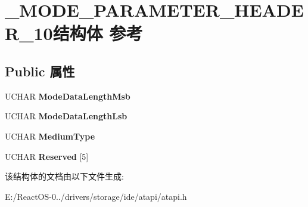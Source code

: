 \hypertarget{struct___m_o_d_e___p_a_r_a_m_e_t_e_r___h_e_a_d_e_r__10}{}\section{\+\_\+\+M\+O\+D\+E\+\_\+\+P\+A\+R\+A\+M\+E\+T\+E\+R\+\_\+\+H\+E\+A\+D\+E\+R\+\_\+10结构体 参考}
\label{struct___m_o_d_e___p_a_r_a_m_e_t_e_r___h_e_a_d_e_r__10}
\subsection*{Public 属性}
\begin{DoxyCompactItemize}
\item 
\mbox{\label{struct___m_o_d_e___p_a_r_a_m_e_t_e_r___h_e_a_d_e_r__10_acf838c5de0e54ced33bde86a585ef5c8}} 
U\+C\+H\+AR {\bfseries Mode\+Data\+Length\+Msb}
\item 
\mbox{\label{struct___m_o_d_e___p_a_r_a_m_e_t_e_r___h_e_a_d_e_r__10_a2e7b2186ecc2ce3bc2bddcda6f06cdad}} 
U\+C\+H\+AR {\bfseries Mode\+Data\+Length\+Lsb}
\item 
\mbox{\label{struct___m_o_d_e___p_a_r_a_m_e_t_e_r___h_e_a_d_e_r__10_a69d4b6c7022656b48b2c63b30abd3531}} 
U\+C\+H\+AR {\bfseries Medium\+Type}
\item 
\mbox{\label{struct___m_o_d_e___p_a_r_a_m_e_t_e_r___h_e_a_d_e_r__10_af88077067fab09d120fe6195d0e343de}} 
U\+C\+H\+AR {\bfseries Reserved} \mbox{[}5\mbox{]}
\end{DoxyCompactItemize}


该结构体的文档由以下文件生成\+:\begin{DoxyCompactItemize}
\item 
E\+:/\+React\+O\+S-\/0../drivers/storage/ide/atapi/atapi.\+h\end{DoxyCompactItemize}
